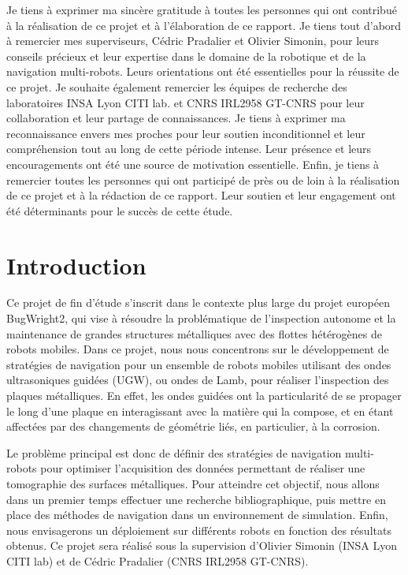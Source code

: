 \documentclass[francais,RandD]{rapportPFE}
\begin{document}
	\begin{remerciements}
		Je tiens à exprimer ma sincère gratitude à toutes les personnes qui ont contribué à la réalisation de ce projet et à l'élaboration de ce rapport.
		Je tiens tout d'abord à remercier mes superviseurs, Cédric Pradalier et Olivier Simonin, pour leurs conseils précieux et leur expertise dans le domaine de la robotique et de la navigation multi-robots. Leurs orientations ont été essentielles pour la réussite de ce projet.
		Je souhaite également remercier les équipes de recherche des laboratoires INSA Lyon CITI lab. et CNRS IRL2958 GT-CNRS pour leur collaboration et leur partage de connaissances.
		Je tiens à exprimer ma reconnaissance envers mes proches pour leur soutien inconditionnel et leur compréhension tout au long de cette période intense.
		Leur présence et leurs encouragements ont été une source de motivation essentielle.
		Enfin, je tiens à remercier toutes les personnes qui ont participé de près ou de loin à la réalisation de ce projet et à la rédaction de ce rapport.
		Leur soutien et leur engagement ont été déterminants pour le succès de cette étude.
	\end{remerciements}
	\setcounter{tocdepth}{3}
	\listoffigures
	\clearpage
	\listoftables
	\clearpage
	\listofalgorithms
	\clearpage
	\tableofcontents
	\cleardoublepage
	\section{Introduction}
		Ce projet de fin d'étude s'inscrit dans le contexte plus large du projet européen BugWright2, qui vise à résoudre la problématique de l'inspection autonome et la maintenance de grandes structures métalliques avec des flottes hétérogènes de robots mobiles.
		Dans ce projet, nous nous concentrons sur le développement de stratégies de navigation pour un ensemble de robots mobiles utilisant des ondes ultrasoniques guidées (UGW), ou ondes de Lamb, pour réaliser l'inspection des plaques métalliques.
		En effet, les ondes guidées ont la particularité de se propager le long d'une plaque en interagissant avec la matière qui la compose, et en étant affectées par des changements de géométrie liés, en particulier, à la corrosion.

		Le problème principal est donc de définir des stratégies de navigation multi-robots pour optimiser l'acquisition des données permettant de réaliser une tomographie des surfaces métalliques.
		Pour atteindre cet objectif, nous allons dans un premier temps effectuer une recherche bibliographique, puis mettre en place des méthodes de navigation dans un environnement de simulation.
		Enfin, nous envisagerons un déploiement sur différents robots en fonction des résultats obtenus.
		Ce projet sera réalisé sous la supervision d'Olivier Simonin (INSA Lyon CITI lab) et de Cédric Pradalier (CNRS IRL2958 GT-CNRS).
\end{document}
